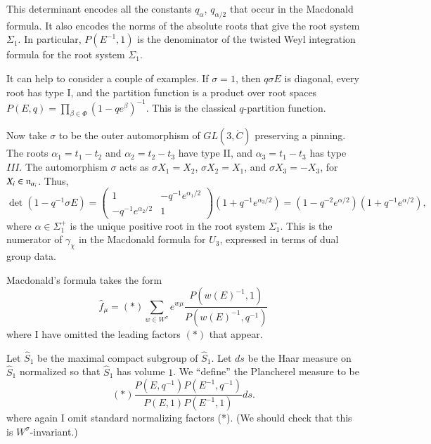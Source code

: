 This determinant encodes all the constants $q_\alpha$, $q_{\alpha/2}$ that occur in the Macdonald formula.
It also encodes the norms of the absolute roots that give the root system $\Sigma_1$.
In particular, $P(E^{-1},1)$ is the denominator of the twisted Weyl integration formula for the root system $\Sigma_1$.

It can help to consider a couple of examples.  If $\sigma=1$, then $q \sigma E$ is diagonal, every root has type I, and the partition function
is a product over root spaces $P(E,q) = \prod_{\beta\in\Phi} (1- q e^\beta)^{-1}$.  This is the classical $q$-partition function.

Now take $\sigma$ to be the outer automorphism of $GL(3,\ring{C})$ preserving a pinning.  The roots $\alpha_1 = t_1-t_2$ and $\alpha_2 = t_2-t_3$ have type II,
and $\alpha_3=t_1-t_3$ has type $III$.  The automorphism $\sigma$ acts as $\sigma X_1 = X_2$, $\sigma X_2 = X_1$, and $\sigma X_3 = - X_3$, for $X_i\in {\mathfrak n}_{\alpha_i}$.
Thus, 
\[
\det(1 - q^{-1} \sigma E) = 
\begin{pmatrix} 1 & -q^{-1} e^{\alpha_1/2}\\ -q^{-1} e^{\alpha_2/2} & 1\end{pmatrix} (1 + q^{-1} e^{\alpha_3/2}) = (1 - q^{-2} e^{\alpha/2}) (1 + q^{-1} e^{\alpha/2}),
\]
where $\alpha\in \Sigma_1^+$ is the unique positive root in the root system $\Sigma_1$.
This is  the numerator of $\gamma_\chi$ in the Macdonald formula for $U_3$, expressed in terms of dual group data.

Macdonald's formula takes the form
\[
\hat f_\mu = (*) \sum_{w\in W^\sigma} e^{w\mu} \frac{P(w(E)^{-1},1)}{P(w(E)^{-1},q^{-1})}
\]
where I have omitted the leading factors $(*)$ that appear.



Let $\hat S_1$ be the maximal compact subgroup of $\hat S_1$.  Let $ds$ be the Haar measure on $\hat S_1$ normalized
so that $\hat S_1$ has volume $1$.
We ``define'' the Plancherel measure to be
\[
(*)\frac{P(E,q^{-1}) P(E^{-1},q^{-1})}{P(E,1) P(E^{-1},1)} ds.
\]
where again I omit standard normalizing factors (*).  (We should check that this is $W^\sigma$-invariant.)



